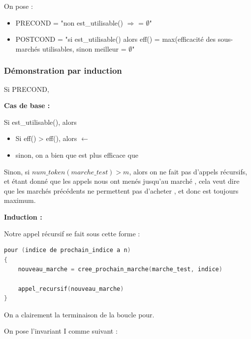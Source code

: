 On pose :

\begin{itemize}
    \item PRECOND = "non est\_utilisable() $\Rightarrow$  = $\emptyset$"
    
    \item POSTCOND = "si est\_utilisable() alors eff() = max(efficacité des sous-marchés utilisables, sinon meilleur = $\emptyset$"
\end{itemize}


\subsubsection*{Démonstration par induction}

\noindent Si PRECOND,

\textbf{Cas de base :}

Si est\_utilisable(), alors 

\begin{itemize}
    \item Si eff() > eff(), alors  $\leftarrow$ 

    \item sinon, on a bien que  est plus efficace que 
\end{itemize}

Sinon, si $num\_token(marche\_test) > m$, alors on ne fait pas d'appels récursifs, et étant donné que les appels nous ont menés jusqu'au marché , cela veut dire que les marchés précédents ne permettent pas d'acheter , et donc  est toujours maximum.

\textbf{Induction :}

Notre appel récursif se fait sous cette forme :

\begin{lstlisting}[language=C, frame=single, caption={Appels récursifs du rendu de monnaie}]
pour (indice de prochain_indice a n)
{
    nouveau_marche = cree_prochain_marche(marche_test, indice)

    appel_recursif(nouveau_marche)
}
\end{lstlisting}

On a clairement la terminaison de la boucle pour.

On pose l'invariant I comme suivant :

